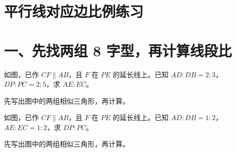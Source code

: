 \documentclass{exam-zh}
\begin{document}
\section*{平行线对应边比例练习}

\section*{一、先找两组 8 字型，再计算线段比}


\begin{problem}[points=10]
  \noindent
  \begin{minipage}[t]{\dimexpr\linewidth-60mm-6mm\relax}
    \vspace{0pt}
    如图，已作 $CF\parallel AB$，且 $F$ 在 $PE$ 的延长线上。已知 $AD:DB=2:3$，$DP:PC=2:5$，求 $AE:EC$。

先写出图中的两组相似三角形，再计算。


  \end{minipage}\hfill
  \begin{diagramcoltikz}{60mm}{第 1 题图}
  }
  \end{diagramcoltikz}
  \par\medskip
  \answerarea[38mm]
\end{problem}



\begin{problem}[points=10]
  \noindent
  \begin{minipage}[t]{\dimexpr\linewidth-60mm-6mm\relax}
    \vspace{0pt}
    如图，已作 $CF\parallel AB$，且 $F$ 在 $PE$ 的延长线上。已知 $AD:DB=1:2$，$AE:EC=1:2$，求 $DP:PC$。

先写出图中的两组相似三角形，再计算。


  \end{minipage}\hfill
  \begin{diagramcoltikz}{60mm}{第 2 题图}
  }
  \end{diagramcoltikz}
  \par\medskip
  \answerarea[38mm]
\end{problem}


\end{document}
